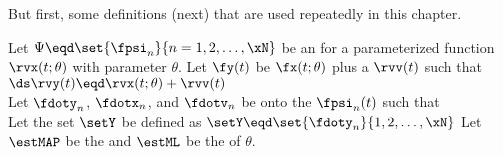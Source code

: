 But first, some definitions (next) that are used repeatedly in this chapter.
\begin{definition}
\label{def:sstat}
Let $\Psi\eqd\set{\fpsi_n}{n=1,2,\ldots,\xN}$ be an  
for a parameterized function $\rvx(t;\theta)$ with parameter $\theta$.
Let $\fy(t)$ be $\fx(t;\theta)$ plus a  $\rvv(t)$ such that 
\\\indentx$\ds
  \rvy(t)\eqd\rvx(t;\theta)+\rvv(t)
$\\
Let $\fdoty_n$, $\fdotx_n$, and $\fdotv_n$ be 
onto the  $\fpsi_n(t)$ such that 
\\
Let the set $\setY$ be defined as $\setY\eqd\set{\fdoty_n}{1,2,\ldots,\xN}$ 
Let $\estMAP$ be the  
and $\estML$  be the   of $\theta$.
\end{definition}

